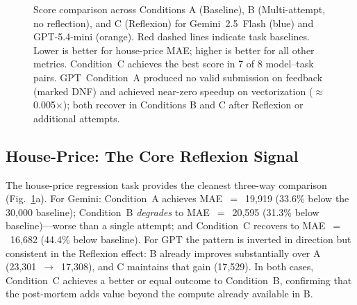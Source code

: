 \documentclass[conference]{IEEEtran}
\begin{document}
\begin{figure}[t]
\caption{Score comparison across Conditions A (Baseline), B (Multi-attempt,
no reflection), and C (Reflexion) for Gemini~2.5~Flash (blue) and
GPT-5.4-mini (orange). Red dashed lines indicate task baselines.
Lower is better for house-price MAE; higher is better for all other metrics.
Condition~C achieves the best score in 7 of 8 model--task pairs.
GPT~Condition~A produced no valid submission on feedback (marked DNF) and
achieved near-zero speedup on vectorization ($\approx$0.005$\times$); both
recover in Conditions B and C after Reflexion or additional attempts.}
\label{fig:results}
\end{figure}

\subsection{House-Price: The Core Reflexion Signal}

The house-price regression task provides the cleanest three-way comparison
(Fig.~\ref{fig:results}a). For Gemini: Condition~A achieves MAE~$=$~19{,}919
(33.6\% below the 30{,}000 baseline); Condition~B \emph{degrades} to
MAE~$=$~20{,}595 (31.3\% below baseline)---worse than a single attempt; and
Condition~C recovers to MAE~$=$~16{,}682 (44.4\% below baseline). For GPT the
pattern is inverted in direction but consistent in the Reflexion effect:
B already improves substantially over A (23{,}301~$\to$~17{,}308), and C
maintains that gain (17{,}529). In both cases, Condition~C achieves a better or
equal outcome to Condition~B, confirming that the post-mortem adds value
beyond the compute already available in B.
\end{document}
